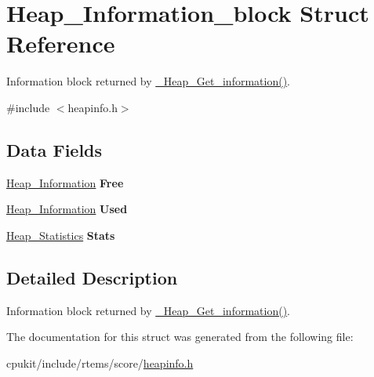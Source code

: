 \hypertarget{structHeap__Information__block}{}\section{Heap\+\_\+\+Information\+\_\+block Struct Reference}
\label{structHeap__Information__block}


Information block returned by \mbox{\hyperlink{group__RTEMSScoreHeap_ga5ee6c8f0dfa456002f117bb202b5c9a6}{\+\_\+\+Heap\+\_\+\+Get\+\_\+information()}}.  




{\ttfamily \#include $<$heapinfo.\+h$>$}

\subsection*{Data Fields}
\begin{DoxyCompactItemize}
\item 
\mbox{\label{structHeap__Information__block_a674107434cf1dd40bbee751c23c976e7}} 
\mbox{\hyperlink{structHeap__Information}{Heap\+\_\+\+Information}} {\bfseries Free}
\item 
\mbox{\label{structHeap__Information__block_afcaf8079e17b6ea3767d1f629fe92a21}} 
\mbox{\hyperlink{structHeap__Information}{Heap\+\_\+\+Information}} {\bfseries Used}
\item 
\mbox{\label{structHeap__Information__block_a59f16432f89f6f47b3cf0e46deaf35e1}} 
\mbox{\hyperlink{structHeap__Statistics}{Heap\+\_\+\+Statistics}} {\bfseries Stats}
\end{DoxyCompactItemize}


\subsection{Detailed Description}
Information block returned by \mbox{\hyperlink{group__RTEMSScoreHeap_ga5ee6c8f0dfa456002f117bb202b5c9a6}{\+\_\+\+Heap\+\_\+\+Get\+\_\+information()}}. 

The documentation for this struct was generated from the following file\+:\begin{DoxyCompactItemize}
\item 
cpukit/include/rtems/score/\mbox{\hyperlink{heapinfo_8h}{heapinfo.\+h}}\end{DoxyCompactItemize}

